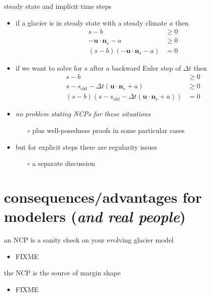 \documentclass[10pt,hyperref,dvipsnames]{beamer}
\newcommand{\bn}{\mathbf{n}}
\newcommand{\bu}{\mathbf{u}}
\begin{document}
\begin{frame}{steady state and implicit time steps}
\begin{itemize}
\item if a glacier is in steady state with a steady climate $a$ then
\begin{align*}
s-b &\ge 0 \\
- \bu \cdot \bn_s - a &\ge 0 \\
(s-b) \left(- \bu \cdot \bn_s - a\right) &= 0
\end{align*}
\item if we want to solve for $s$ after a backward Euler step of $\Delta t$ then
\begin{align*}
s-b &\ge 0 \\
s - s_{\text{old}} - \Delta t\left(\bu \cdot \bn_s + a\right) &\ge 0 \\
(s-b) \left(s - s_{\text{old}} - \Delta t\left(\bu \cdot \bn_s + a\right)\right) &= 0
\end{align*}
\item \emph{no problem stating NCPs for these situations}
    \begin{itemize}
    \item[$\circ$] plus well-posedness proofs in some particular cases
    \end{itemize}
\item but for explicit steps there are regularity issues
    \begin{itemize}
    \item[$\circ$] a separate discussion
    \end{itemize}
\end{itemize}
\end{frame}


\section{consequences/advantages for modelers (\emph{and real people})}

\begin{frame}{an NCP is a sanity check on your evolving glacier model}
\begin{itemize}
\item FIXME 
\end{itemize}
\end{frame}

\begin{frame}{the NCP is the source of margin shape}
\begin{itemize}
\item FIXME 
\end{itemize}
\end{frame}
\end{document}
